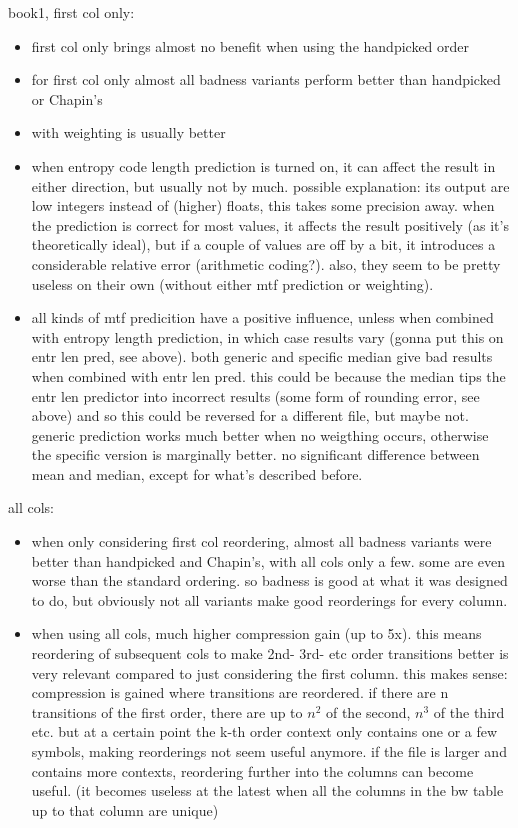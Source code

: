 \documentclass[a4paper]{scrreprt}
\begin{document}
book1, first col only:
\begin{itemize}
  \item first col only brings almost no benefit when using the handpicked order
  \item for first col only almost all badness variants perform better than
  handpicked or Chapin's
  \item with weighting is usually better
  \item when entropy code length prediction is turned on, it can affect the
  result in either direction, but usually not by much. possible explanation: its
  output are low integers instead of (higher) floats, this takes some precision
  away. when the prediction is correct for most values, it affects the result
  positively (as it's theoretically ideal), but if a couple of values are off by
  a bit, it introduces a considerable relative error (arithmetic coding?). also,
  they seem to be pretty useless on their own (without either mtf prediction or
  weighting).
  \item all kinds of mtf predicition have a positive influence, unless when
  combined with entropy length prediction, in which case results vary (gonna
  put this on entr len pred, see above). both generic and specific median give
  bad results when combined with entr len pred. this could be because the median
  tips the entr len predictor into incorrect results (some form of rounding
  error, see above) and so this could be reversed for a different file, but
  maybe not. generic prediction works much better when no weigthing occurs,
  otherwise the specific version is marginally better. no significant difference
  between mean and median, except for what's described before.
\end{itemize}

all cols:
\begin{itemize}
  \item when only considering first col reordering, almost all badness variants
  were better than handpicked and Chapin's, with all cols only a few. some are
  even worse than the standard ordering. so badness is good at what it was
  designed to do, but obviously not all variants make good reorderings for every
  column.
  \item when using all cols, much higher compression gain (up to 5x). this means
  reordering of subsequent cols to make 2nd- 3rd- etc order transitions better
  is very relevant compared to just considering the first column. this makes
  sense: compression is gained where transitions are reordered. if there are n
  transitions of the first order, there are up to \(n^2\) of the second, \(n^3\)
  of the third etc. but at a certain point the k-th order context only contains
  one or a few symbols, making reorderings not seem useful anymore. if the file
  is larger and contains more contexts, reordering further into the columns can
  become useful. (it becomes useless at the latest when all the columns in the
  bw table up to that column are unique)
\end{itemize}
\end{document}
